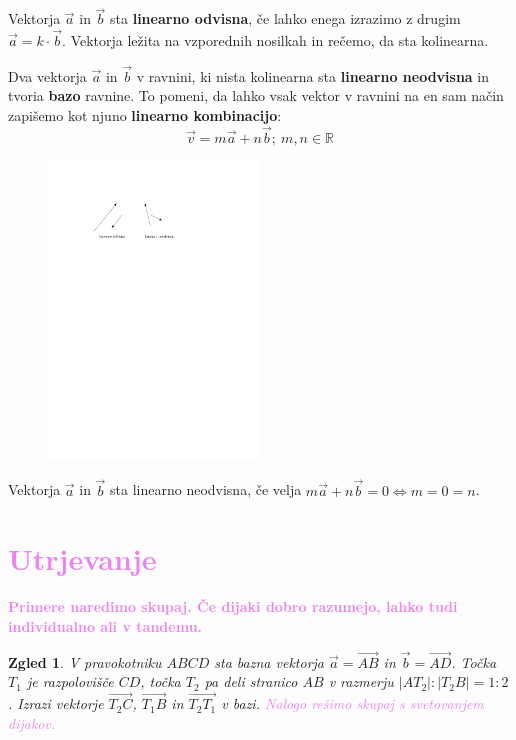 \documentclass{article}
\newtheorem*{zgled}{Zgled}
\begin{document}
Vektorja $\vec{a}$ in $\vec{b}$ sta \textbf{linearno odvisna}, če lahko enega izrazimo z drugim $\vec{a}=k\cdot \vec{b}$. Vektorja ležita na vzporednih nosilkah in rečemo, da sta kolinearna.

Dva vektorja $\vec{a}$ in $\vec{b}$ v ravnini, ki nista kolinearna sta \textbf{linearno neodvisna} in tvoria \textbf{bazo} ravnine. To pomeni, da lahko vsak vektor v ravnini na en sam način zapišemo kot njuno \textbf{linearno kombinacijo}:
\[\vec{v}=m\vec{a}+n\vec{b};\ m,n\in\mathbb{R}\]

\begin{figure}[H]
    \includegraphics[width=0.5\textwidth]{odvisnost.pdf}
    \centering
\end{figure}

Vektorja $\vec{a}$ in $\vec{b}$ sta linearno neodvisna, če velja $m\vec{a}+n\vec{b}=0 \iff m=0=n$.

\section*{\textcolor{violet}{Utrjevanje}}
\textbf{\textcolor{violet}{Primere naredimo skupaj. Če dijaki dobro razumejo, lahko tudi individualno ali v tandemu.}}

\begin{zgled}
    V pravokotniku $ABCD$ sta bazna vektorja $\vec{a}=\vec{AB}$ in $\vec{b}=\vec{AD}$. Točka $T_1$ je razpolovišče $CD$, točka $T_2$ pa deli stranico $AB$ v razmerju $|AT_2|:|T_2 B|=1:2$. Izrazi vektorje $\vec{T_2 C}$, $\vec{T_1 B}$ in $\vec{T_2 T_1}$ v bazi. \textcolor{violet}{Nalogo rešimo skupaj s svetovanjem dijakov.}
\end{zgled}
\end{document}
